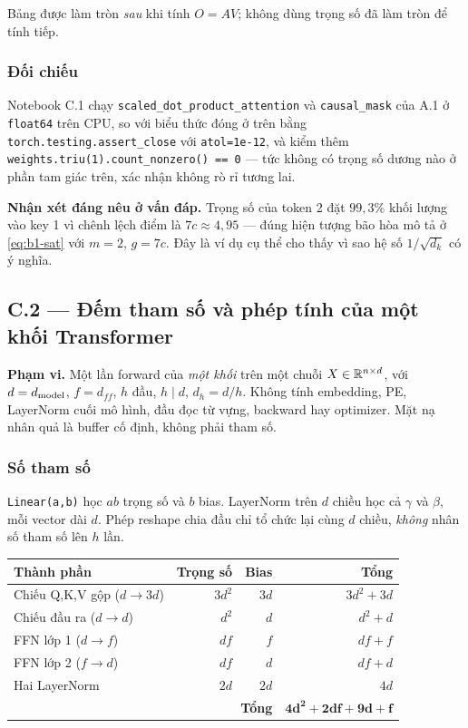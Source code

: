 Bảng được làm tròn \emph{sau} khi tính $O=AV$; không dùng trọng số đã làm tròn để
tính tiếp.

\subsubsection{Đối chiếu \dalam}

Notebook C.1 chạy \texttt{scaled\_dot\_product\_attention} và \texttt{causal\_mask}
của A.1 ở \texttt{float64} trên CPU, so với biểu thức đóng ở trên bằng
\texttt{torch.testing.assert\_close} với \texttt{atol=1e-12}, và kiểm thêm
\texttt{weights.triu(1).count\_nonzero() == 0} --- tức không có trọng số dương nào
ở phần tam giác trên, xác nhận không rò rỉ tương lai.

\textbf{Nhận xét đáng nêu ở vấn đáp.} Trọng số của token 2 đặt $99{,}3\%$ khối
lượng vào key 1 vì chênh lệch điểm là $7c\approx4{,}95$ --- đúng hiện tượng bão hòa
mô tả ở \eqref{eq:b1-sat} với $m=2$, $g=7c$. Đây là ví dụ cụ thể cho thấy vì sao
hệ số $1/\sqrt{d_k}$ có ý nghĩa.

\subsection{C.2 --- Đếm tham số và phép tính của một khối Transformer}
\label{sec:c2}

\textbf{Phạm vi.} Một lần forward của \emph{một khối} trên một chuỗi
$X\in\mathbb{R}^{n\times d}$, với $d=d_{\mathrm{model}}$, $f=d_{ff}$, $h$ đầu, $h\mid d$,
$d_h=d/h$. Không tính embedding, PE, LayerNorm cuối mô hình, đầu đọc từ vựng,
backward hay optimizer. Mặt nạ nhân quả là buffer cố định, không phải tham số.

\subsubsection{Số tham số}

\texttt{Linear(a,b)} học $ab$ trọng số và $b$ bias. LayerNorm trên $d$ chiều học cả
$\gamma$ và $\beta$, mỗi vector dài $d$. Phép reshape chia đầu chỉ tổ chức lại cùng
$d$ chiều, \emph{không} nhân số tham số lên $h$ lần.

\begin{center}
\begin{tabular}{lrrr}
\toprule
\textbf{Thành phần} & \textbf{Trọng số} & \textbf{Bias} & \textbf{Tổng}\\
\midrule
Chiếu Q,K,V gộp ($d\to3d$) & $3d^2$ & $3d$ & $3d^2+3d$\\
Chiếu đầu ra ($d\to d$) & $d^2$ & $d$ & $d^2+d$\\
FFN lớp 1 ($d\to f$) & $df$ & $f$ & $df+f$\\
FFN lớp 2 ($f\to d$) & $df$ & $d$ & $df+d$\\
Hai LayerNorm & $2d$ & $2d$ & $4d$\\
\midrule
\multicolumn{3}{r}{\textbf{Tổng}} & $\mathbf{4d^2+2df+9d+f}$\\
\bottomrule
\end{tabular}
\end{center}

